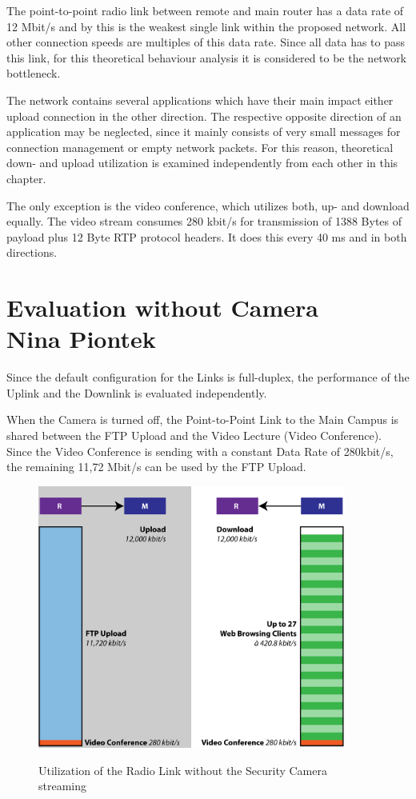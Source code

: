 \documentclass[a4paper,10pt]{book}\usepackage{graphicx}
\begin{document}
The point-to-point radio link between remote and main router has a data rate 
of 12 Mbit/s and by this is the weakest single link within the proposed network. 
All other connection speeds are multiples of this data rate. Since all data has 
to pass this link, for this theoretical behaviour analysis it is considered to 
be the network bottleneck.

The network contains several applications which have their main impact either
upload connection in the other direction. The respective opposite direction of an
 application may be neglected, since it mainly consists of very small messages for connection management or empty network packets. For 
 this reason, theoretical down- and upload utilization is examined independently from each other in this chapter. 

The only exception is the video conference, which utilizes both, up- and download 
equally. The video stream consumes 280 kbit/s for transmission of 1388 Bytes of 
payload plus 12 Byte RTP protocol headers. It does this every 40 ms and in both 
directions.

\section{Evaluation without Camera\\ {\large Nina Piontek}}
Since the default configuration for the Links is full-duplex, the performance of the Uplink and the Downlink is evaluated independently.

When the Camera is turned off, the Point-to-Point Link to the Main Campus is shared between the FTP Upload and the Video Lecture (Video Conference).
Since the Video Conference is sending with a constant Data Rate of 280kbit/s, the remaining 
11,72 Mbit/s can be used by the FTP Upload.
\begin{figure}[!ht]
  \centering
    \includegraphics[width=0.9\textwidth]{graphics-02.png}
    \label{fig:g2}
    \caption{Utilization of the Radio Link without the Security Camera streaming}
\end{figure}
\end{document}
